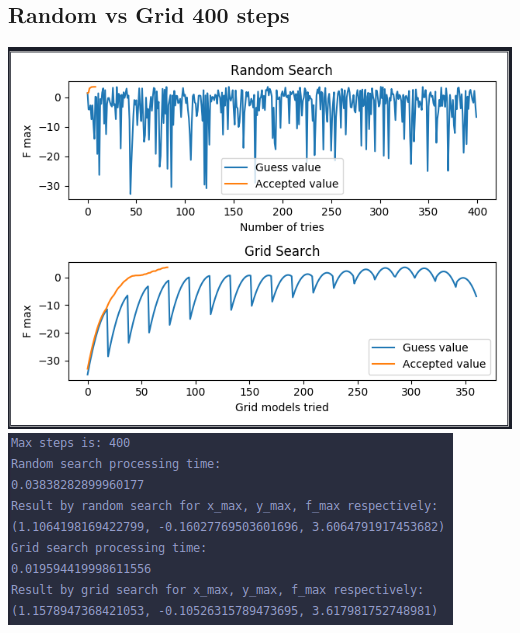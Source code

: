 \documentclass[12pt]{article}
\begin{document}
      \subsection*{Random vs Grid 400 steps}
        \begin{center}
          \includegraphics{../RandomVsGrid400Plot.png}
          \includegraphics{../RandomVsGrid400Result.png}
        \end{center}
\end{document}
